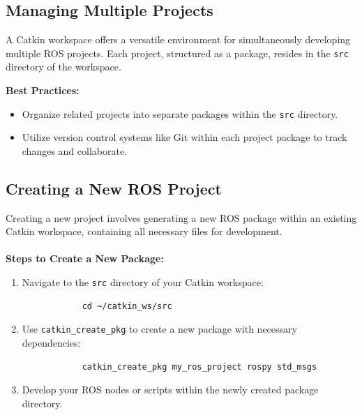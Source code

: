 \documentclass[12pt,a4paper]{article}
\begin{document}
	\subsection{Managing Multiple Projects}
	A Catkin workspace offers a versatile environment for simultaneously developing multiple ROS projects. Each project, structured as a package, resides in the \texttt{src} directory of the workspace.
	
	\textbf{Best Practices:}
	\begin{itemize}
		\item Organize related projects into separate packages within the \texttt{src} directory.
		\item Utilize version control systems like Git within each project package to track changes and collaborate.
	\end{itemize}
	
	\subsection{Creating a New ROS Project}
	Creating a new project involves generating a new ROS package within an existing Catkin workspace, containing all necessary files for development.
	\\\\
	\noindent\textbf{Steps to Create a New Package:}
	\begin{enumerate}
		\item Navigate to the \texttt{src} directory of your Catkin workspace:
		\begin{verbatim}
			cd ~/catkin_ws/src
		\end{verbatim}
		\item Use \texttt{catkin\_create\_pkg} to create a new package with necessary dependencies:
		\begin{verbatim}
			catkin_create_pkg my_ros_project rospy std_msgs
		\end{verbatim}
		
		\item Develop your ROS nodes or scripts within the newly created package directory.
	\end{enumerate}
	
\end{document}
